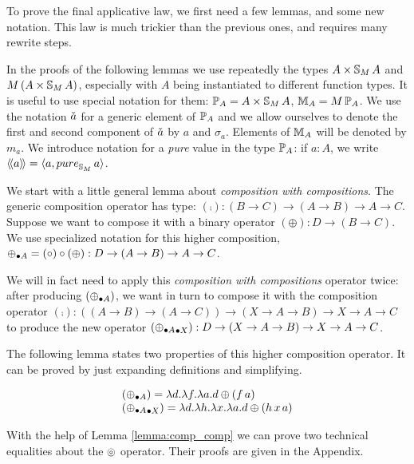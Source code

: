 To prove the final applicative law, we first need a few lemmas, and some new notation.
This law is much trickier than the previous ones, and requires many rewrite steps.

In the proofs of the following lemmas we use repeatedly the types $A\times \mathbb{S}_{M}\,A$ and $M\,(A\times \mathbb{S}_{M}\,A)$, especially with $A$ being instantiated to different function types.
It is useful to use special notation for them:
$\mathbb{P}_{A} = A\times \mathbb{S}_{M}\,A$, $\mathbb{M}_{A} = M\,\mathbb{P}_{A}$.
We use the notation $\check{a}$ for a generic element of $\mathbb{P}_{A}$
and we allow ourselves to denote the first and second component of $\check{a}$ by $a$ and $\sigma_a$.
Elements of $\mathbb{M}_{A}$ will be denoted by $m_a$.
We introduce notation for a {\em pure} value in the type $\mathbb{P}_{A}$:
if $a:A$, we write $\ppair{a} = \langle a, \apure_{\stream{M}}\,a \rangle$.

We start with a little general lemma about {\em composition with compositions}.
The generic composition operator has type: $(\comp): (B\rightarrow C) \rightarrow (A\rightarrow B) \rightarrow A \rightarrow C$.
Suppose we want to compose it with a binary operator $(\oplus) : D\rightarrow (B\rightarrow C)$.
We use specialized notation for this higher composition, $\mathbin{\oplus_{\bullet A}} = (\circ) \circ (\oplus) : D \rightarrow (A\rightarrow B) \rightarrow A \rightarrow C$.

We will in fact need to apply this {\em composition with compositions} operator twice: after producing $(\mathbin{\oplus_{\bullet A}})$, we want in turn to compose it with the composition operator $(\comp): ((A\rightarrow B) \rightarrow (A\rightarrow C)) \rightarrow (X\rightarrow A\rightarrow B) \rightarrow X \rightarrow A \rightarrow C$ to produce the new operator $(\mathbin{\mathbin{\oplus_{\bullet A}}_{\bullet X}}): D\rightarrow (X\rightarrow A \rightarrow B) \rightarrow X \rightarrow A \rightarrow C$.

The following lemma states two properties of this higher composition operator.
It can be proved by just expanding definitions and simplifying.
\begin{lemma}\label{lemma:comp_comp}
$$
\begin{array}{l}
(\mathbin{\oplus_{\bullet A}}) = \lambda d.\lambda f. \lambda a. d\oplus (f\,a) \\
(\mathbin{\mathbin{\oplus_{\bullet A}}_{\bullet X}}) =
\lambda d. \lambda h. \lambda x.\lambda a. d\oplus (h\,x\,a)
\end{array}
$$
\end{lemma}

With the help of Lemma \ref{lemma:comp_comp} we can prove two technical equalities about the $\circledcirc$ operator. Their proofs are given in the Appendix.

